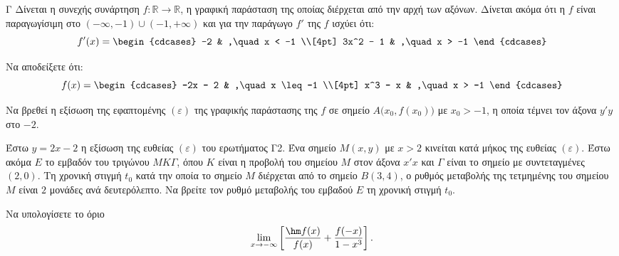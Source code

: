 \begin{thema}{Γ}
Δίνεται η συνεχής συνάρτηση $f: \mathbb{R} \to \mathbb{R}$, η γραφική παράσταση της οποίας διέρχεται από την αρχή των αξόνων. Δίνεται ακόμα ότι η $f$ είναι παραγωγίσιμη στο $(-\infty,-1) \cup (-1,+\infty)$ και για την παράγωγο $f'$ της $f$ ισχύει ότι:
\[
f'(x) =
\begin{cdcases}
-2 & ,\quad x < -1 \\[4pt]
3x^2 - 1 & ,\quad x > -1
\end{cdcases}
\]
\begin{erwthma}
    \item Να αποδείξετε ότι:
    \[
    f(x) =
    \begin{cdcases}
    -2x - 2 & ,\quad x \leq -1 \\[4pt]
    x^3 - x & ,\quad x > -1
    \end{cdcases}
    \]

    \item Να βρεθεί η εξίσωση της εφαπτομένης $(\varepsilon)$ της γραφικής παράστασης της $f$ σε σημείο $A\bigl(x_0, f(x_0)\bigr)$ με $x_0 > -1$, η οποία τέμνει τον άξονα $y'y$ στο $-2$. 

    \item Έστω $y = 2x - 2$ η εξίσωση της ευθείας $(\varepsilon)$ του ερωτήματος Γ2. Ένα σημείο $M(x, y)$ με $x > 2$ κινείται κατά μήκος της ευθείας $(\varepsilon)$. Έστω ακόμα $E$ το εμβαδόν του τριγώνου $MK\Gamma$, όπου $K$ είναι η προβολή του σημείου $M$ στον άξονα $x'x$ και $\Gamma$ είναι το σημείο με συντεταγμένες $(2, 0)$. Τη χρονική στιγμή $t_0$ κατά την οποία το σημείο $M$ διέρχεται από το σημείο $B(3, 4)$, ο ρυθμός μεταβολής της τετμημένης του σημείου $M$ είναι $2$ μονάδες ανά δευτερόλεπτο. Να βρείτε τον ρυθμό μεταβολής του εμβαδού $E$ τη χρονική στιγμή $t_0$. 

    \item Να υπολογίσετε το όριο
    \[
    \lim_{x \to -\infty}\left[\frac{\hm f(x)}{f(x)} + \frac{f(-x)}{1 - x^3}\right].
    \]
\end{erwthma}
\end{thema}

